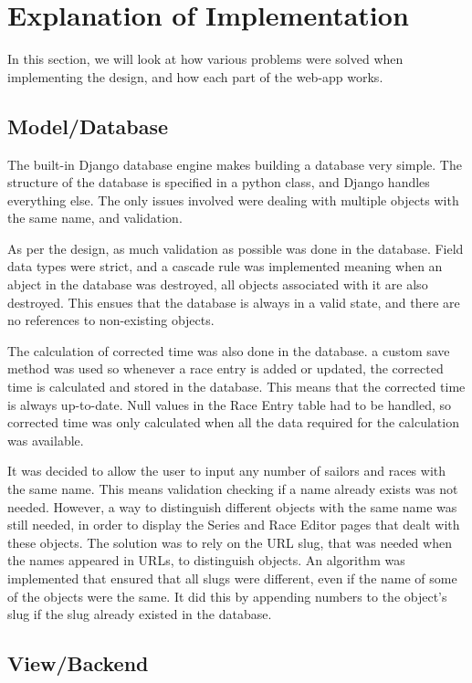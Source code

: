 \documentclass{l4proj}
\begin{document}
\section{Explanation of Implementation}
In this section, we will look at how various problems were solved when implementing the design, and how each part of the web-app works.

\subsection{Model/Database}

The built-in Django database engine makes building a database very simple. The structure of the database is specified in a python class, and Django handles everything else. The only issues involved were dealing with multiple objects with the same name, and validation.

As per the design, as much validation as possible was done in the database. Field data types were strict, and a cascade rule was implemented meaning when an abject in the database was destroyed, all objects associated with it are also destroyed. This ensues that the database is always in a valid state, and there are no references to non-existing objects.

The calculation of corrected time was also done in the database. a custom save method was used so whenever a race entry is added or updated, the corrected time is calculated and stored in the database. This means that the corrected time is always up-to-date. Null values in the Race Entry table had to be handled, so corrected time was only calculated when all the data required for the calculation was available.

It was decided to allow the user to input any number of sailors and races with the same name. This means validation checking if a name already exists was not needed. However, a way to distinguish different objects with the same name was still needed, in order to display the Series and Race Editor pages that dealt with these objects. The solution was to rely on the URL slug, that was needed when the names appeared in URLs, to distinguish objects. An algorithm was implemented that ensured that all slugs were different, even if the name of some of the objects were the same. It did this by appending numbers to the object's slug if the slug already existed in the database.
 
\subsection{View/Backend}
\end{document}
